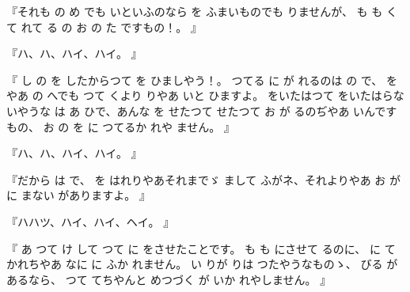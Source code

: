 『それも
の
め
でも
いといふのなら
を
ふまいものでも
りませんが、
も
も
く
て
れて
る
の
お
の
た
ですもの！。
』

『ハ、ハ、ハイ、ハイ。
』

『
し
の
を
したからつて
を
ひましやう！。
つてる
に
が
れるのは
の
で、
を
やあ
の
へでも
つて
くより
りやあ
いと
ひますよ。
をいたはつて
をいたはらないやうな
は
あ
ひで、あんな
を
せたつて
せたつて
お
が
るのぢやあ
いんですもの、
お
の
を
に
つてるか
れや
ません。
』

『ハ、ハ、ハイ、ハイ。
』

『だから
は
で、
を
はれりやあそれまでゞ
まして
ふがネ、それよりやあ
お
が
に
まない
がありますよ。
』

『ハハツ、ハイ、ハイ、ヘイ。
』

『
あ
つて
け
して
つて
に
をさせたことです。
も
も
にさせて
るのに、
に
て
かれちやあ
なに
に
ふか
れません。
い
りが
りは
つたやうなものゝ、
びる
があるなら、
つて
てちやんと
めつづく
が
いか
れやしません。
』

